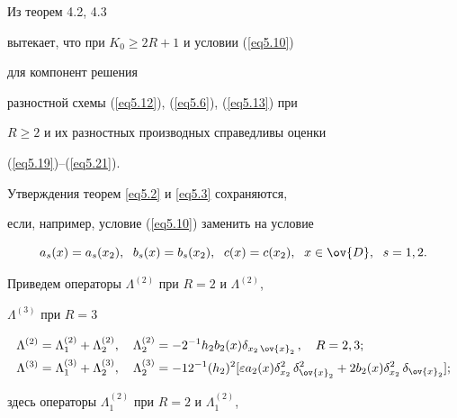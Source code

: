 \begin{note}


Из теорем 4.2, 4.3


вытекает, что при $K_0\ge 2R+1$ и условии (\ref{eq5.10})


для компонент решения


разностной схемы (\ref{eq5.12}), (\ref{eq5.6}), (\ref{eq5.13}) при


$R\ge2$ и их разностных производных справедливы оценки


(\ref{eq5.19})--(\ref{eq5.21}).


\end{note}





\begin{note}


Утверждения теорем \ref{eq5.2} и \ref{eq5.3} сохраняются,


если, например, условие (\ref{eq5.10}) заменить на условие


$$


a_s(x)=a_s(x_2),\ \; b_s(x)=b_s(x_2),\ \; c(x)=c(x_2),\ \;


x\in \ov{D},\ \; s=1,2.


$$


\end{note}





Приведем операторы $\Lambda^{(2)}$ при $R=2$ и $\Lambda^{(2)}$,


$\Lambda^{(3)}$ при $R=3$


\begin{align*}


&\Lambda^{(2)}=\Lambda_1^{(2)}+\Lambda_2^{(2)},\quad


\Lambda_2^{(2)}=-2^{-1}h_2 b_2(x)\delta_{x_2\,\ov{x}_2}\,,


\quad R=2,3; \\


&\Lambda^{(3)}=\Lambda_1^{(3)}+\Lambda_2^{(3)},\quad


\Lambda^{(3)}_2=-12^{-1}(h_2)^2[\eps


a_2(x)\delta^2_{x_2}\,\delta^2_{\ov{x}_2}+


2b_2(x)\delta^2_{x_2}\,\delta_{\ov{x}_2}];


\end{align*}


здесь операторы $\Lambda_1^{(2)}$ при $R=2$ и $\Lambda_1^{(2)}$,


